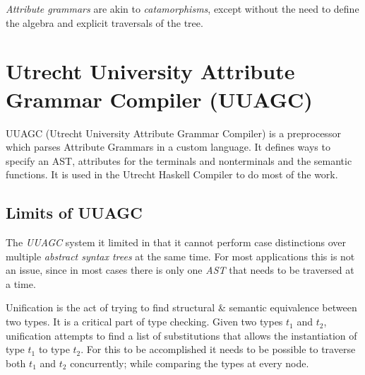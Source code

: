 \documentclass[twoside, titlepage, openright, a4paper]{book}
\newcommand{\Ags}{\emph{Attribute grammars }}
\begin{document}
\Ags are akin to \emph{catamorphisms}, except without the need to define the algebra and explicit traversals of the tree.

\section{Utrecht University Attribute Grammar Compiler (UUAGC)}
UUAGC (Utrecht University Attribute Grammar Compiler) is a preprocessor which parses Attribute Grammars in a custom language.
It defines ways to specify an AST, attributes for the terminals and nonterminals and the semantic functions. It is used in the Utrecht Haskell Compiler to do most of the work.

\subsection{Limits of UUAGC}
The \emph{UUAGC} system it limited in that it cannot perform case distinctions over multiple \emph{abstract syntax trees} at the same time\cite{visitag}. For most applications this is not an issue, since in most cases there is only one \emph{AST} that needs to be traversed at a time. 

Unification is the act of trying to find structural \& semantic equivalence between two types. It is a critical part of type checking. Given two types \emph{$t_{1}$} and \emph{$t_{2}$}, unification attempts to find a list of substitutions that allows the instantiation of type \emph{$t_{1}$} to type \emph{$t_{2}$}. For this to be accomplished it needs to be possible to traverse both \emph{$t_{1}$} and \emph{$t_{2}$} concurrently; while comparing the types at every node.

%
%    
%
\end{document}
